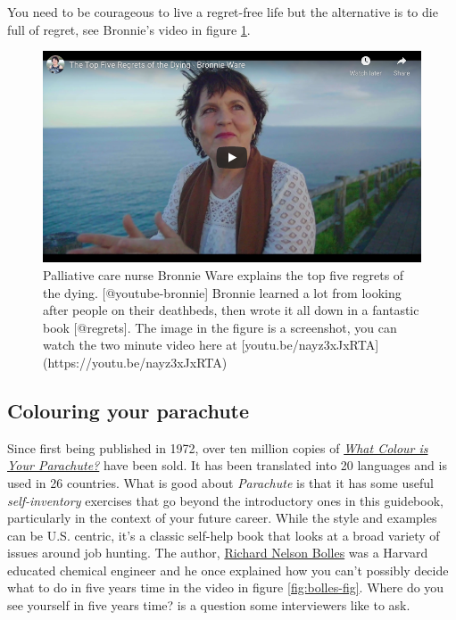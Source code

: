 \documentclass[
]{book}
\begin{document}
You need to be courageous to live a regret-free life but the alternative is to die full of regret, see Bronnie's video in figure \ref{fig:bronnie-fig}.

\begin{figure}

{\centering \includegraphics[width=0.99\linewidth]{images/youtube-bronnie} 

}

\caption{Palliative care nurse Bronnie Ware explains the top five regrets of the dying. [@youtube-bronnie] Bronnie learned a lot from looking after people on their deathbeds, then wrote it all down in a fantastic book [@regrets]. The image in the figure is a screenshot, you can watch the two minute video here at [youtu.be/nayz3xJxRTA](https://youtu.be/nayz3xJxRTA) }\label{fig:bronnie-fig}
\end{figure}

\hypertarget{parachute}{%
\subsection{Colouring your parachute}\label{parachute}}

Since first being published in 1972, over ten million copies of \emph{\href{https://en.wikipedia.org/wiki/What_Color_is_Your_Parachute\%3F}{What Colour is Your Parachute?}} have been sold. It has been translated into 20 languages and is used in 26 countries. What is good about \emph{Parachute} is that it has some useful \emph{self-inventory} exercises that go beyond the introductory ones in this guidebook, particularly in the context of your future career. While the style and examples can be U.S. centric, it's a classic self-help book that looks at a broad variety of issues around job hunting. The author, \href{https://en.wikipedia.org/wiki/Richard_Nelson_Bolles}{Richard Nelson Bolles} was a Harvard educated chemical engineer and he once explained how you can't possibly decide what to do in five years time in the video in figure \ref{fig:bolles-fig}. Where do you see yourself in five years time? is a question some interviewers like to ask.
\end{document}
